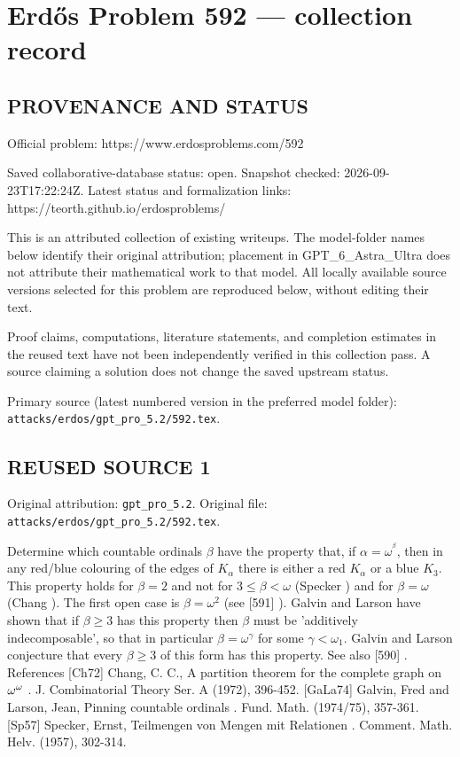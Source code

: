 \section*{Erd\H{o}s Problem 592 --- collection record}

\subsection*{PROVENANCE AND STATUS}
Official problem: https://www.erdosproblems.com/592

Saved collaborative-database status: open.
Snapshot checked: 2026-09-23T17:22:24Z.
Latest status and formalization links: https://teorth.github.io/erdosproblems/

This is an attributed collection of existing writeups. The model-folder names below identify their original attribution; placement in GPT\_6\_Astra\_Ultra does not attribute their mathematical work to that model. All locally available source versions selected for this problem are reproduced below, without editing their text.

Proof claims, computations, literature statements, and completion estimates in the reused text have not been independently verified in this collection pass. A source claiming a solution does not change the saved upstream status.

Primary source (latest numbered version in the preferred model folder): \texttt{attacks/erdos/gpt\_pro\_5.2/592.tex}.

\subsection*{REUSED SOURCE 1}
Original attribution: \texttt{gpt\_pro\_5.2}.
Original file: \texttt{attacks/erdos/gpt\_pro\_5.2/592.tex}.


Determine which countable ordinals $\beta$ have the property that, if $\alpha=\omega^{^\beta}$, then in any red/blue colouring of the edges of $K_\alpha$ there is either a red $K_\alpha$ or a blue $K_3$. This property holds for $\beta=2$ and not for $3\leq \beta <\omega$ (Specker \cite{Sp57}) and for $\beta=\omega$ (Chang \cite{Ch72}). The first open case is $\beta=\omega^2$ (see [591] ). Galvin and Larson \cite{GaLa74} have shown that if $\beta\geq 3$ has this property then $\beta$ must be 'additively indecomposable', so that in particular $\beta=\omega^\gamma$ for some $\gamma<\omega_1$. Galvin and Larson conjecture that every $\beta\geq 3$ of this form has this property. See also [590] . References [Ch72] Chang, C. C., A partition theorem for the complete graph on {$\omega\sp{\omega }$} . J. Combinatorial Theory Ser. A (1972), 396-452. [GaLa74] Galvin, Fred and Larson, Jean, Pinning countable ordinals . Fund. Math. (1974/75), 357-361. [Sp57] Specker, Ernst, Teilmengen von Mengen mit Relationen . Comment. Math. Helv. (1957), 302-314.


